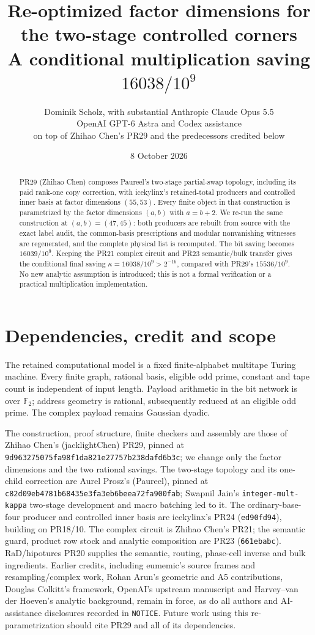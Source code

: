 \documentclass[11pt]{article}
\title{Re-optimized factor dimensions for the two-stage controlled corners\\
\large A conditional multiplication saving $16038/10^9$}
\author{Dominik Scholz, with substantial Anthropic Claude Opus 5.5\\
OpenAI GPT-6 Astra and Codex assistance\\
\small on top of Zhihao Chen's PR29 and the predecessors credited below}
\date{8 October 2026}
\begin{document}
\maketitle
\begin{abstract}
PR29 (Zhihao Chen) composes Paureel's two-stage partial-swap topology,
including its paid rank-one copy correction, with icekylinx's
retained-total producers and controlled inner basis at factor dimensions
$(55,53)$. Every finite object in that construction is parametrized by the
factor dimensions $(a,b)$ with $a=b+2$. We re-run the same construction at
$(a,b)=(47,45)$: both producers are rebuilt from source with the exact
label audit, the common-basis prescriptions and modular nonvanishing
witnesses are regenerated, and the complete physical list is recomputed.
The bit saving becomes $16039/10^9$. Keeping the PR21 complex circuit and
PR23 semantic/bulk transfer gives the conditional final saving
$\kappa=16038/10^9>2^{-16}$, compared with PR29's $15536/10^9$. No new
analytic assumption is introduced; this is not a formal verification or a
practical multiplication implementation.
\end{abstract}

\section{Dependencies, credit and scope}
The retained computational model is a fixed finite-alphabet multitape
Turing machine. Every finite graph, rational basis, eligible odd prime,
constant and tape count is independent of input length. Payload arithmetic
in the bit network is over $\mathbb F_2$; address geometry is rational,
subsequently reduced at an eligible odd prime. The complex payload remains
Gaussian dyadic.

The construction, proof structure, finite checkers and assembly are those of
Zhihao Chen's (jacklightChen) PR29, pinned at
\texttt{9d963275075fa98f1da821e27757b238dafd6b3c}; we change only the factor
dimensions and the two rational savings. The two-stage topology and its
one-child correction are Aurel Prosz's (Paureel), pinned at
\texttt{c82d09eb4781b68435e3fa3eb6beea72fa900fab}; Swapnil Jain's
\texttt{integer-mult-kappa} two-stage development and macro batching led to
it. The ordinary-base-four producer and controlled inner basis are
icekylinx's PR24 (\texttt{ed90fd94}), building on PR18/10. The complex
circuit is Zhihao Chen's PR21; the semantic guard, product row stock and
analytic composition are PR23 (\texttt{661ebabc}). RaD/hipotures PR20
supplies the semantic, routing, phase-cell inverse and bulk ingredients.
Earlier credits, including eumemic's source frames and resampling/complex
work, Rohan Arun's geometric and A5 contributions, Douglas Colkitt's
framework, OpenAI's upstream manuscript and Harvey--van der Hoeven's
analytic background, remain in force, as do all authors and AI-assistance
disclosures recorded in \texttt{NOTICE}. Future work using this
re-parametrization should cite PR29 and all of its dependencies.
\end{document}
